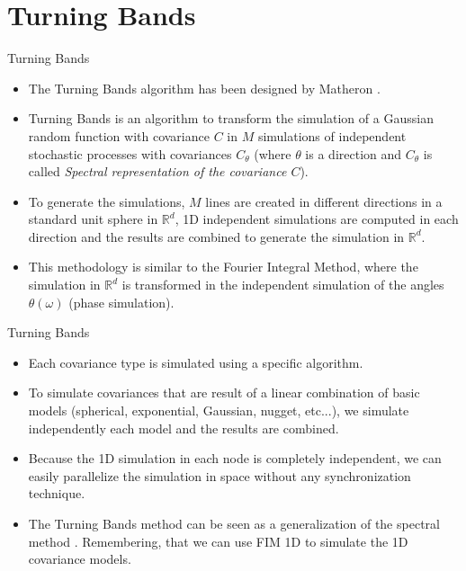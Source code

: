 \section{Turning Bands}

\begin{frame}{Turning Bands}
  \begin{itemize}
  	 \item The Turning Bands algorithm has been designed by Matheron \cite{matheron1973intrinsic}.
    \item Turning Bands is an algorithm to transform the simulation of a Gaussian random function with covariance $C$ in $M$ simulations of independent stochastic processes with covariances $C_\theta$ (where $\theta$ is a direction and $C_\theta$ is called \textit{Spectral representation of the covariance $C$}).
    \item To generate the simulations, $M$ lines are created in different directions in a standard unit sphere in $\mathbb{R}^d$, 1D independent simulations are computed in each direction and the results are combined to generate the simulation in $\mathbb{R}^d$. 
    \item This methodology is similar to the Fourier Integral Method, where the simulation in $\mathbb{R}^d$ is transformed in the independent simulation of the angles $\theta(\omega)$ (phase simulation).
  \end{itemize}

\end{frame}

\begin{frame}{Turning Bands}
\begin{itemize}
\item Each covariance type is simulated using a specific algorithm. \cite{emery2006tbsim}
\item To simulate covariances that are result of a linear combination of basic models (spherical, exponential, Gaussian, nugget, etc...), we simulate independently each model and the results are combined.
\item Because the 1D simulation in each node is completely independent, 
we can easily parallelize the simulation in space without any synchronization technique. 
\item The Turning Bands method can be seen as a generalization of the spectral method \cite{lantuejoul2013geostatistical}. Remembering, that we can use FIM 1D to simulate the 1D covariance models. 
\end{itemize}
\end{frame}

